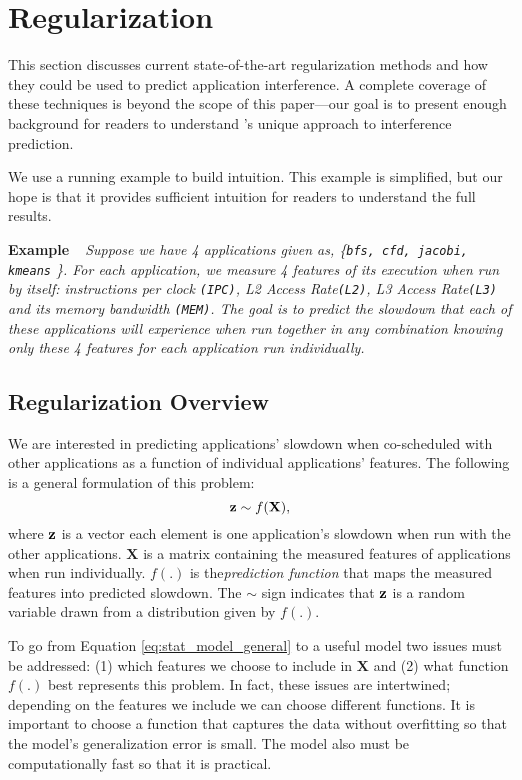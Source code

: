 \section{Regularization}
\label{sec:regression}
This section discusses current state-of-the-art regularization methods
and how they could be used to predict application interference.  A
complete coverage of these techniques is beyond the scope of this
paper---our goal is to present enough background for readers to
understand \SYSTEM{}'s unique approach to interference prediction.

We use a running example to build intuition.  This example is
simplified, but our hope is that it provides sufficient intuition for
readers to understand the full results.

\noindent \textbf{Example~~}\textit{Suppose we have 4 applications
  given as, \{\texttt{bfs, cfd, jacobi, kmeans} \}.  For each
  application, we measure 4 features of its execution when run by
  itself: instructions per clock \texttt{(IPC)}, L2 Access
  Rate\texttt{(L2)}, L3 Access Rate\texttt{(L3)} and its memory
  bandwidth \texttt{(MEM)}.  The goal is to predict the slowdown that
  each of these applications will experience when run together in any
  combination knowing only these 4 features for each application run
  individually.  }

\subsection{Regularization Overview}
We are interested in predicting applications' slowdown when
co-scheduled with other applications as a function of individual
applications' features. The following is a general formulation of this
problem:
\begin{equation}
\label{eq:stat_model_general}
\mathbf{z} \sim f(\mathbf{X}),
\end{equation}
where $\mathbf{z}$ is a vector each element is one application's slowdown when
run with the other applications.  $\mathbf{X}$ is a matrix containing
the measured features of applications when run individually.  $f(.)$
is the\emph{prediction function} that maps the measured features into
predicted slowdown.  The $\sim$ sign indicates that $\mathbf{z}$ is a random
variable drawn from a distribution given by $f(.)$.

To go from Equation \eqref{eq:stat_model_general} to a useful model
two issues must be addressed: (1) which features we choose to include
in $\mathbf{X}$ and (2) what function $f(.)$ best represents this
problem. In fact, these issues are intertwined; depending on the
features we include we can choose different functions.  It is
important to choose a function that captures the data without
overfitting so that the model's generalization error is small.  The
model also must be computationally fast so that it is practical.


